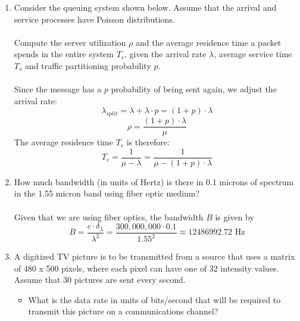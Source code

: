 \documentclass[12pt]{article}
\begin{document}
\begin{enumerate}
\item Consider the queuing system shown below. Assume that the arrival and service processes have Poisson distributions. \\ \\
Compute the server utilization $\rho$  and the average residence time a packet spends in the entire system $T_r$, given the arrival rate $\lambda$, average service time $T_s$ and traffic partitioning probability $p$. \\ \\
Since the message has a $p$ probability of being sent again, we adjust the arrival rate:
\[ \lambda_{split} = \lambda + \lambda\cdot p = (1+p)\cdot \lambda \] 
\[ \rho = \frac{(1+p)\cdot\lambda}{\mu} \]
The average residence time $T_r$ is therefore:
\[ T_r = \frac{1}{\mu-\lambda} = \frac{1}{\mu - (1+p)\cdot\lambda} \]

\newpage

\item How much bandwidth (in units of Hertz) is there in 0.1 microns of spectrum in the 1.55 micron band using fiber optic medium?  \\ \\
 
Given that we are using fiber optics, the bandwidth $B$ is given by 
\[ B = \frac{c \cdot \delta_{\lambda}}{\lambda^2} = \frac{300,000,000 \cdot 0.1}{1.55^2} \approx 12486992.72 \textrm{ Hz} \]

\newpage

\item A digitized TV picture is to be transmitted from a source that uses a matrix of 480 x 500 pixels, where each pixel can have one of 32 intensity values.  Assume that 30 pictures are sent every second.  
  \begin{itemize}
  \item What is the data rate in units of bits/second that will be required to transmit this picture on a communications channel? 
    

\end{itemize}
\end{enumerate}
\end{document}
